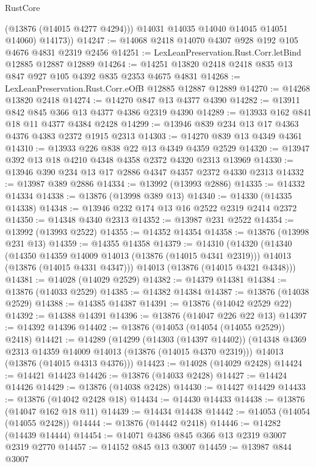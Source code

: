 \begin{lexlean}{RustCore}
\begin{coremodule}
            (@13876 (@14015 @4277 @4294)))
          @14031
          @14035
          @14040
          @14045
          @14051
          @14060)
        @14173))
@14247 := @14068 @2418 @14070 @4307 @928 @192 @105 @4676 @4831 @2319 @2456
@14251 := LexLeanPreservation.Rust.Corr.letBind @12885 @12887 @12889
@14264 := @14251 @13820 @2418 @2418 @835 @13 @847 @927 @105 @4392 @835 @2353 @4675 @4831
@14268 := LexLeanPreservation.Rust.Corr.eOfB @12885 @12887 @12889
@14270 := @14268 @13820 @2418
@14274 := @14270 @847 @13 @4377 @4390
@14282 := @13911 @842 @845 @366 @13 @4377 @4386 @2319 @4390
@14289 := @13933 @162 @841 @18 @11 @4377 @4384 @2428
@14299 := @13946 @839 @234 @13 @17 @4363 @4376 @4383 @2372 @1915 @2313
@14303 := @14270 @839 @13 @4349 @4361
@14310 := @13933 @226 @838 @22 @13 @4349 @4359 @2529
@14320 := @13947 @392 @13 @18 @4210 @4348 @4358 @2372 @4320 @2313 @13969
@14330 := @13946 @390 @234 @13 @17 @2886 @4347 @4357 @2372 @4330 @2313
@14332 := @13987 @389 @2886
@14334 := @13992 (@13993 @2886)
@14335 := @14332 @14334
@14338 := @13876 (@13998 @389 @13)
@14340 := @14330 (@14335 @14338)
@14348 := @13946 @232 @174 @13 @16 @2522 @2319 @2414 @2372
@14350 := @14348 @4340 @2313
@14352 := @13987 @231 @2522
@14354 := @13992 (@13993 @2522)
@14355 := @14352 @14354
@14358 := @13876 (@13998 @231 @13)
@14359 := @14355 @14358
@14379 := @14310
    (@14320
      (@14340
        (@14350 @14359 @14009 @14013 (@13876 (@14015 @4341 @2319)))
        @14013
        (@13876 (@14015 @4331 @4347)))
      @14013
      (@13876 (@14015 @4321 @4348)))
@14381 := @14028 (@14029 @2529)
@14382 := @14379 @14381
@14384 := @13876 (@14033 @2529)
@14385 := @14382 @14384
@14387 := @13876 (@14038 @2529)
@14388 := @14385 @14387
@14391 := @13876 (@14042 @2529 @22)
@14392 := @14388 @14391
@14396 := @13876 (@14047 @226 @22 @13)
@14397 := @14392 @14396
@14402 := @13876 (@14053 (@14054 (@14055 @2529)) @2418)
@14421 := @14289
    (@14299
      (@14303 (@14397 @14402))
      (@14348 @4369 @2313 @14359 @14009 @14013 (@13876 (@14015 @4370 @2319)))
      @14013
      (@13876 (@14015 @4313 @4376)))
@14423 := @14028 (@14029 @2428)
@14424 := @14421 @14423
@14426 := @13876 (@14033 @2428)
@14427 := @14424 @14426
@14429 := @13876 (@14038 @2428)
@14430 := @14427 @14429
@14433 := @13876 (@14042 @2428 @18)
@14434 := @14430 @14433
@14438 := @13876 (@14047 @162 @18 @11)
@14439 := @14434 @14438
@14442 := @14053 (@14054 (@14055 @2428))
@14444 := @13876 (@14442 @2418)
@14446 := @14282 (@14439 @14444)
@14454 := @14071 @4386 @845 @366 @13 @2319 @3007 @2319 @2770
@14457 := @14152 @845 @13 @3007
@14459 := @13987 @844 @3007

\end{coremodule}
\end{lexlean}
